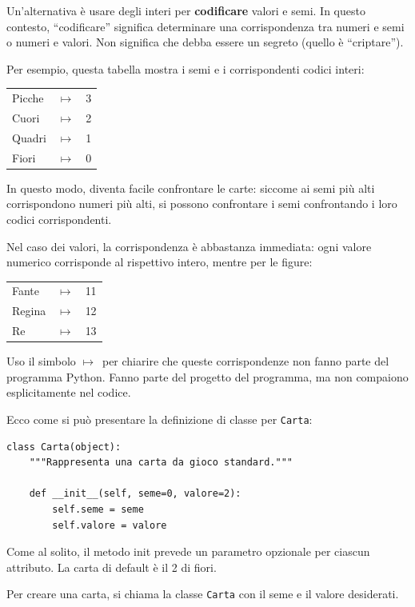\documentclass[10pt]{book}
\begin{document}
Un'alternativa è usare degli interi per {\bf codificare} valori e semi.
In questo contesto, ``codificare'' significa determinare una corrispondenza tra numeri e semi o numeri e valori. Non significa che debba essere un segreto (quello è ``criptare'').

\newcommand{\mymapsto}{$\mapsto$}

Per esempio, questa tabella mostra i semi e i corrispondenti codici interi:

\begin{tabular}{l c l}
Picche & \mymapsto & 3 \\
Cuori & \mymapsto & 2 \\
Quadri & \mymapsto & 1 \\
Fiori & \mymapsto & 0
\end{tabular}

In questo modo, diventa facile confrontare le carte: siccome ai semi più alti corrispondono numeri più alti, si possono confrontare i semi confrontando i loro codici corrispondenti.

Nel caso dei valori, la corrispondenza è abbastanza immediata: ogni valore numerico corrisponde al rispettivo intero, mentre per le figure:

\begin{tabular}{l c l}
Fante & \mymapsto & 11 \\
Regina & \mymapsto & 12 \\
Re & \mymapsto & 13 \\
\end{tabular}

Uso il simbolo \mymapsto~per chiarire che queste corrispondenze non fanno parte del programma Python. Fanno parte del progetto del programma, ma non compaiono esplicitamente nel codice.

Ecco come si può presentare la definizione di classe per {\tt Carta}:

\begin{verbatim}
class Carta(object):
    """Rappresenta una carta da gioco standard."""

    def __init__(self, seme=0, valore=2):
        self.seme = seme
        self.valore = valore
\end{verbatim}
%
Come al solito, il metodo init prevede un parametro opzionale per ciascun attributo. La carta di default è il 2 di fiori.

Per creare una carta, si chiama la classe {\tt Carta} con il seme e il valore desiderati.
\end{document}
